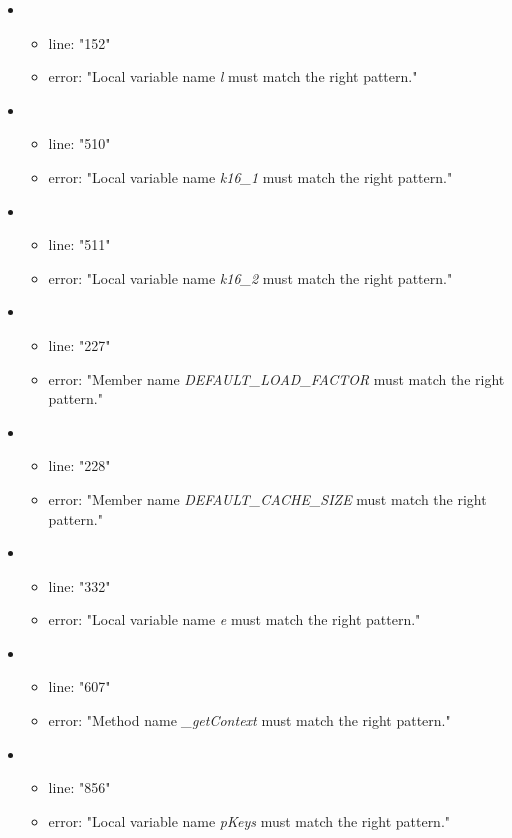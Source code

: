 \begin{itemize}
	\item 
	\begin{itemize} 
		\item line: "152" 
		\item error: "Local variable name \emph{l} must match the right pattern." 
	\end{itemize}
	\item 
	\begin{itemize} 
		\item line: "510" 
		\item error: "Local variable name \emph{k16\_1} must match the right pattern." 
	\end{itemize}
	\item 
	\begin{itemize} 
		\item line: "511" 
		\item error: "Local variable name \emph{k16\_2} must match the right pattern." 
	\end{itemize}
	\item 
	\begin{itemize} 
		\item line: "227" 
		\item error: "Member name \emph{DEFAULT\_LOAD\_FACTOR} must match the right pattern." 
	\end{itemize}
	\item 
	\begin{itemize} 
		\item line: "228" 
		\item error: "Member name \emph{DEFAULT\_CACHE\_SIZE} must match the right pattern." 
	\end{itemize}
	\item 
	\begin{itemize} 
		\item line: "332" 
		\item error: "Local variable name \emph{e} must match the right pattern." 
	\end{itemize}
	\item 
	\begin{itemize} 
		\item line: "607" 
		\item error: "Method name \emph{\_getContext} must match the right pattern." 
	\end{itemize}
	\item 
	\begin{itemize} 
		\item line: "856" 
		\item error: "Local variable name \emph{pKeys} must match the right pattern." 

\end{itemize}
\end{itemize}
